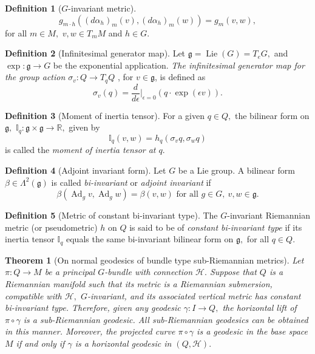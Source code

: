 \documentclass [xcolor=svgnames, t] {beamer}
\theoremstyle{definition}
\newtheorem{df}{Definition}
\theoremstyle{plain}
\newtheorem{thm}{Theorem}
\theoremstyle{remark}
\begin{document}
\begin{frame}
\begin{df}[$G$-invariant metric]
	$$ g_{m\cdot h}((d\alpha_h)_m(v),(d\alpha_h)_m(w))=g_m(v,w), $$ 
	for all $ m\in M, $ $ v,w\in T_mM $ and $ h\in G. $ 
\end{df}
\begin{df}[Infinitesimal generator map]
Let $ \mathfrak{g}= \operatorname{Lie}(G)=T_eG, $ and $ \operatorname{exp} : \mathfrak{g}\rightarrow G $ be the exponential application. \textit{The infinitesimal generator map for the group action $ \sigma_v: Q\rightarrow T_qQ $ }, for $ v \in \mathfrak{g} $,  is defined as
$$ \sigma_v(q) = \frac{d}{d\epsilon} \Big|_{\epsilon=0} \left( q\cdot \operatorname{exp} (\epsilon v) \right).$$ 
 \end{df}
 \begin{df}[Moment of inertia tensor]
	For a given $ q\in Q, $ the bilinear form on $ \mathfrak{g}, $ $ \mathbb{I}_q: \mathfrak{g}\times \mathfrak{g}\rightarrow \mathbb{R}, $ given by
	$$ \mathbb{I}_q(v,w) = h_q(\sigma_v q, \sigma_w q) $$ 
	is called the \textit{moment of inertia tensor at $ q. $ } 
 \end{df}
 \begin{df}[Adjoint invariant form]
	Let $ G $ be a Lie group. A bilinear form $ \beta \in \Lambda^2(\mathfrak{g}) $ is called \textit{bi-invariant} or \textit{adjoint invariant} if
	$$ \beta \left( \operatorname{Ad}_g v, \operatorname{Ad}_g w \right) = \beta(v,w) \text{ for all }g\in G,\ v,w\in \mathfrak{g}. $$ 
\end{df}
\begin{df}
	[Metric of constant bi-invariant type] The $ G $-invariant Riemannian metric (or pseudometric) $ h $ on $ Q $ is said to be of \textit{constant bi-invariant type} if its inertia tensor $ \mathbb{I}_q $ equals the same bi-invariant bilinear form on $ \mathfrak{g}, $ for all $q\in Q. $ 
\end{df}
\begin{thm}[On normal geodesics of bundle type sub-Riemannian metrics]\label{thm:normal_geodesics}
	Let $ \pi: Q \rightarrow M $ be a principal $ G $-bundle with connection $ \mathcal{H}. $ Suppose that $ Q $ is a Riemannian manifold such that its metric is a Riemannian submersion, compatible with $ \mathcal{H}, $ $ G $-invariant, and its associated vertical metric has constant bi-invariant type. Therefore, given any geodesic $\gamma: I \rightarrow Q, $ the horizontal lift of $ \pi\circ\gamma $ is a sub-Riemannian geodesic. All sub-Riemannian geodesics can be obtained in this manner. Moreover, the projected curve $ \pi\circ\gamma$ is a geodesic in the base space $ M $ if and only if $ \gamma $ is a horizontal geodesic in $ (Q, \mathcal{H}). $ 
\end{thm}
\end{frame}
\end{document}
